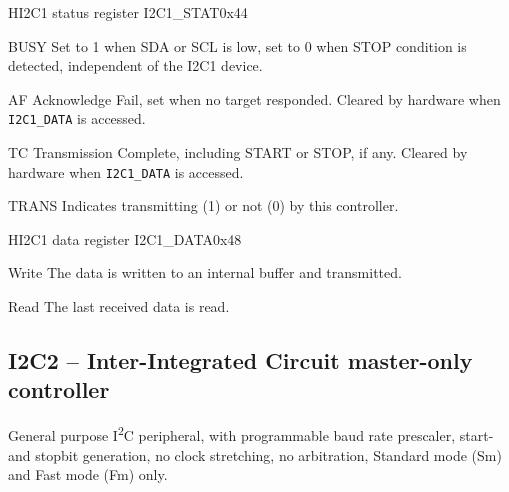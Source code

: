 \documentclass[12pt]{article}
\begin{document}
\begin{register}{H}{I2C1 status register I2C1\_STAT}{0x44}
\label{i2c1stat}
%
%
%
%
%
%
\regnewline%
\end{register}
\begin{regdesc}[0.8\textwidth]\begin{reglist}[0000000]
\item [BUSY] Set to 1 when SDA or SCL is low, set to 0 when STOP condition is detected, independent of the I2C1 device.
\item [AF] Acknowledge Fail, set when no target responded. Cleared by hardware when \lstinline|I2C1_DATA| is accessed.
\item [TC] Transmission Complete, including START or STOP, if any. Cleared by hardware when \lstinline|I2C1_DATA| is accessed.
\item [TRANS] Indicates transmitting (1) or not (0) by this controller.
\end{reglist}\end{regdesc}

\begin{register}{H}{I2C1 data register I2C1\_DATA}{0x48}
\label{i2c11data}
%
\regnewline%
\end{register}
\begin{regdesc}[0.8\textwidth]\begin{reglist}[000000000]
\item[Write] The data is written to an internal buffer and transmitted.
\item[Read] The last received data is read.
\end{reglist}\end{regdesc}


\subsection{I2C2 -- Inter-Integrated Circuit master-only controller}
General purpose I\textsuperscript{2}C peripheral, with programmable baud rate prescaler, start- and stopbit generation, no clock stretching, no arbitration, Standard mode (Sm) and Fast mode (Fm) only.
\end{document}
